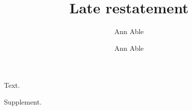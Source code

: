 \documentclass{revtex4-2}
\begin{document}
\title{Late restatement}
\author{Ann Able}
\maketitle
Text.
\clearpage
\author{Ann Able}
Supplement.
\end{document}
